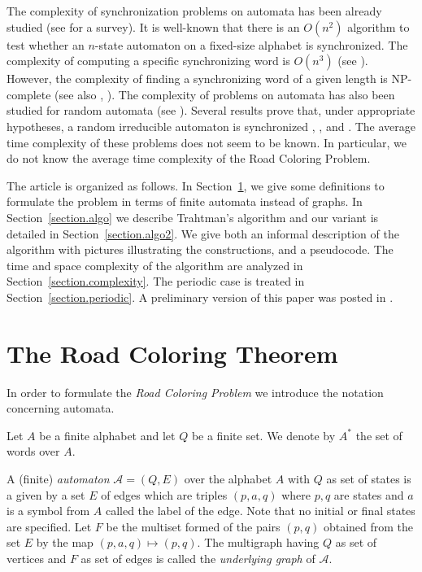 \documentclass[11pt,a4paper]{article}
\def\A{\mathcal{A}}
\begin{document}
The complexity of synchronization problems on automata has been
already studied (see \cite{KariVolkov2013} for a survey). It is
well-known that there is an $O(n^2)$ algorithm to test whether an
$n$-state automaton on a fixed-size alphabet is synchronized. The
complexity of computing a specific synchronizing word is $O(n^3)$ (see
\cite{Eppstein1990}).  However, the complexity of finding a
synchronizing word of a given length is NP-complete
\cite{Eppstein1990} (see also \cite{OlschewskiUmmels2010},
\cite{Roman2011}). The complexity of problems on automata has also
been studied for random automata (see
\cite{CarayolNicaud2012}). Several results prove that, under
appropriate hypotheses, a random irreducible automaton is synchronized
\cite{FreilingEtAl2003}, \cite{SkvortsovZaks2010}, and
\cite{Nicaud2013}. The average time complexity of these problems does not
seem to be known. In particular, we do not know the average time
complexity of the Road Coloring Problem.


The article is organized as follows. In Section~\ref{section.road}, we
give some definitions to formulate the problem in terms of finite
automata instead of graphs. In Section~\ref{section.algo} we describe
Trahtman's algorithm and our variant is detailed in
Section~\ref{section.algo2}. We give both an informal description of
the algorithm with pictures illustrating the constructions, and a
pseudocode. The time and space complexity of the algorithm are
analyzed in Section~\ref{section.complexity}. The periodic case is
treated in Section~\ref{section.periodic}. A preliminary version of this paper was posted in \cite{BealPerrin2008}.

\section{The Road Coloring Theorem} \label{section.road} 

In order to formulate the \emph{Road Coloring Problem} we introduce
the notation concerning automata.  

Let $A$ be a finite alphabet and let $Q$ be a finite set.  We denote
by $A^*$ the set of words over $A$. 

A (finite) \emph{automaton} $\A=(Q,E)$ over the alphabet $A$ with $Q$
as set of states is a given by a set $E$ of edges which are triples
$(p,a,q)$ where $p,q$ are states and $a$ is a symbol from $A$ called
the label of the edge. Note that no initial or final states are
specified.  Let $F$ be the multiset formed of the pairs $(p,q)$
obtained from the set $E$ by the map $(p,a,q) \mapsto (p,q)$.  The
multigraph having $Q$ as set of vertices and $F$ as set of edges is
called the \emph{underlying graph} of $\A$.
\end{document}
